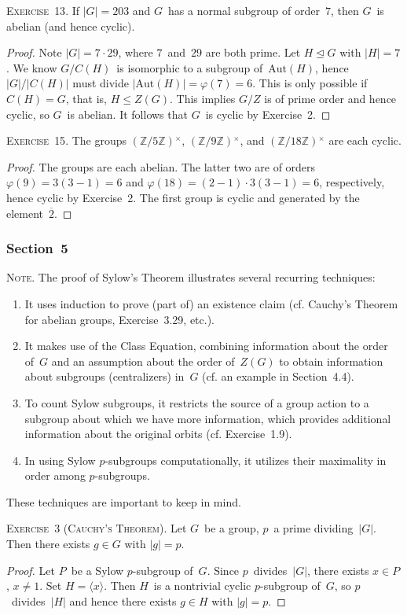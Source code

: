 \documentclass[letterpaper]{article}
\newcommand{\exercise}[1]{\goodbreak\noindent\textsc{Exercise~{#1}.}}
\newcommand{\note}{\goodbreak\noindent\textsc{Note.}}
\newcommand{\Z}{\mathbb{Z}}
\newcommand{\subgroup}{\le}
\newcommand{\normal}{\trianglelefteq}
\newcommand{\aut}{\mathrm{Aut}}
\newcommand{\mi}[1]{{#1}{}^{\times}}
\newcommand{\res}[1]{\overline{#1}}
\newcommand{\ord}[1]{|{#1}|}
\newcommand{\gen}[1]{\langle{#1}\rangle}
\begin{document}
\exercise{13}
If $\ord{G}=203$ and $G$~has a normal subgroup of order~$7$, then $G$~is abelian (and hence cyclic).
\begin{proof}
Note $\ord{G}=7\cdot 29$, where $7$~and~$29$ are both prime. Let $H\normal G$ with $\ord{H}=7$. We know $G/C(H)$~is isomorphic to a subgroup of~$\aut(H)$, hence $\ord{G}/\ord{C(H)}$ must divide $\ord{\aut(H)}=\varphi(7)=6$. This is only possible if $C(H)=G$, that is, $H\subgroup Z(G)$. This implies $G/Z$ is of prime order and hence cyclic, so $G$~is abelian. It follows that $G$~is cyclic by Exercise~2.
\end{proof}

\exercise{15}
The groups $\mi{(\Z/5\Z)}$, $\mi{(\Z/9\Z)}$, and $\mi{(\Z/18\Z)}$ are each cyclic.
\begin{proof}
The groups are each abelian. The latter two are of orders $\varphi(9)=3(3-1)=6$ and $\varphi(18)=(2-1)\cdot3(3-1)=6$, respectively, hence cyclic by Exercise~2. The first group is cyclic and generated by the element~$\res{2}$.
\end{proof}

\subsubsection*{Section~5}
\note
The proof of Sylow's Theorem illustrates several recurring techniques:
\begin{enumerate}[itemsep=0pt]
\item It uses induction to prove (part of) an existence claim (cf. Cauchy's Theorem for abelian groups, Exercise~3.29, etc.).
\item It makes use of the Class Equation, combining information about the order of~$G$ and an assumption about the order of~$Z(G)$ to obtain information about subgroups (centralizers) in~$G$ (cf. an example in Section~4.4).
\item To count Sylow subgroups, it restricts the source of a group action to a subgroup about which we have more information, which provides additional information about the original orbits (cf. Exercise~1.9).
\item In using Sylow $p$-subgroups computationally, it utilizes their maximality in order among $p$-subgroups.
\end{enumerate}
\noindent These techniques are important to keep in mind.

\bigskip
\exercise{3 (Cauchy's Theorem)}
Let $G$~be a group, $p$~a prime dividing~$\ord{G}$. Then there exists $g\in G$ with $\ord{g}=p$.
\begin{proof}
Let $P$~be a Sylow $p$-subgroup of~$G$. Since $p$~divides~$\ord{G}$, there exists $x\in P$, $x\ne1$. Set $H=\gen{x}$. Then $H$~is a nontrivial cyclic $p$-subgroup of~$G$, so $p$~divides~$\ord{H}$ and hence there exists $g\in H$ with $\ord{g}=p$.
\end{proof}
\end{document}
